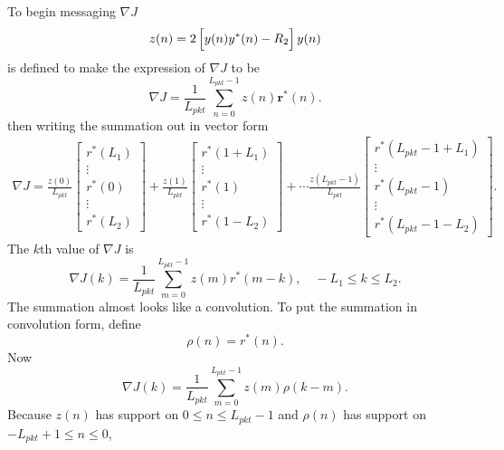 To begin messaging $\nabla J$ 
\begin{equation}
z(n) = 	2\left[ \vphantom{\displaystyle\sum}  y(n) y^\ast(n) - R_2 \right] y(n)
\end{equation} 
is defined to make the expression of $\nabla J$ to be
\begin{equation}
	\nabla J = \frac{1}{L_{pkt}} \sum_{n=0}^{L_{pkt}-1}
	z(n)  \mathbf{r}^\ast(n).
\label{eq:DelJcma-midMassage}
\end{equation}
then writing the summation out in vector form
\begin{multline}
\nabla J
	= 
	\frac{z(0)}{L_{pkt}}
		\begin{bmatrix} r^\ast(L_1) \\ \vdots \\ r^\ast(0) \\ \vdots \\ r^\ast(L_2) \end{bmatrix} +
	\frac{z(1)}{L_{pkt}}
		\begin{bmatrix} r^\ast(1+L_1) \\ \vdots \\ r^\ast(1) \\ \vdots \\ r^\ast(1-L_2) \end{bmatrix} + \cdots
	\frac{z(L_{pkt}-1)}{L_{pkt}}
		\begin{bmatrix} r^\ast(L_{pkt}-1+L_1) \\ \vdots \\ r^\ast(L_{pkt}-1) \\ \vdots \\ r^\ast(L_{pkt}-1-L_2) \end{bmatrix}
\label{eq:delJ_writeoutr}.
\end{multline}
The $k$th value of $\nabla J$ is
\begin{equation}
\nabla J(k) = \frac{1}{L_{pkt}} \sum^{L_{pkt}-1}_{m=0}  z(m) r^\ast(m-k), \quad -L_1 \leq k \leq L_2.
\end{equation}
The summation almost looks like a convolution.
To put the summation in convolution form, define
\begin{equation}
\rho(n) = r^\ast(n).
\end{equation}
Now
\begin{equation}
\nabla J(k) = \frac{1}{L_{pkt}} \sum^{L_{pkt}-1}_{m=0}  z(m) \rho(k-m).
\label{eq:CMA_delJ_rice_reformed}
\end{equation}
Because $z(n)$ has support on $0 \leq n \leq L_{pkt}-1$ and $\rho(n)$ has support on $-L_{pkt}+1 \leq n \leq 0$, 
